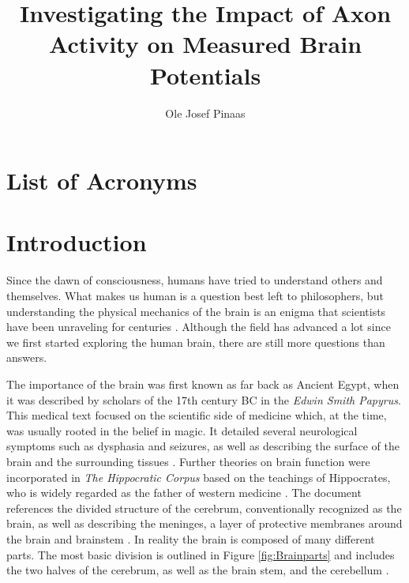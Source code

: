 \documentclass[final, a4paper,masters,en,listoffigures,listoftables,norwegiandates]{NMBU}
\title{Investigating the Impact of Axon Activity on Measured Brain Potentials}
\author{Ole Josef Pinaas}
\begin{document}
\section*{List of Acronyms}
\begin{acronym}
\end{acronym}

\startthesis %


\section{Introduction} \label{sec: introduction}
Since the dawn of consciousness, humans have tried to understand others and themselves. What makes us human is a question best left to philosophers, but understanding the physical mechanics of the brain is an enigma that scientists have been unraveling for centuries \cite{finger1994origins}. Although the field has advanced a lot since we first started exploring the human brain, there are still more questions than answers.

The importance of the brain was first known as far back as Ancient Egypt, when it was described by scholars of the 17th century BC in the \textit{Edwin Smith Papyrus}. This medical text focused on the scientific side of medicine which, at the time, was usually rooted in the belief in magic. It detailed several neurological symptoms such as dysphasia and seizures, as well as describing the surface of the brain and the surrounding tissues \cite{kandel2021principles}. Further theories on brain function were incorporated in \textit{The Hippocratic Corpus} based on the teachings of Hippocrates, who is widely regarded as the father of western medicine \cite{Hippocratesinfluenceontheoriginsofneurosurgery, Koutserimpas2024hippocrates}. The document references the divided structure of the cerebrum, conventionally recognized as the brain, as well as describing the meninges, a layer of protective membranes around the brain and brainstem \cite{breitenfeld2014hippocrates}. In reality the brain is composed of many different parts. The most basic division is outlined in Figure \ref{fig:Brainparts} and includes the two halves of the cerebrum, as well as the brain stem, and the cerebellum \cite{Swanson2000}.
\end{document}

